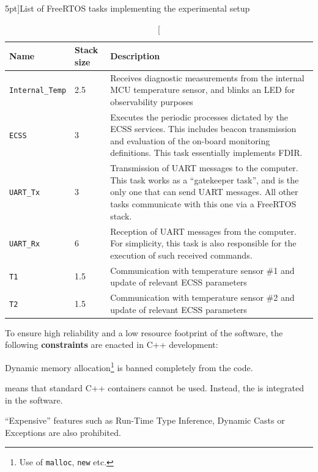 \documentclass[a4paper,nobib,final]{tufte-book}
\begin{document}
\begin{table}[h]
	\centering
	\caption[][5pt]{List of Free\acs{RTOS} tasks implementing the experimental setup}
	\label{tab:rtos-tasks}
	\renewcommand{\arraystretch}{1.5}
	\begin{tabularx}{\textwidth}{@{}llX@{}}
		\toprule
		Name & Stack size & Description \\ \midrule
		\texttt{Internal\_Temp} & \SI{2.5}{\kilo\byte} & Receives diagnostic measurements from the internal \acs{MCU} temperature sensor, and blinks an \acs{LED} for observability purposes \\
		\texttt{ECSS} & \SI{3}{\kilo\byte} & Executes the periodic processes dictated by the \acs{ECSS} services. This includes beacon transmission and evaluation of the on-board monitoring definitions. This task essentially implements \acs{FDIR}. \\
		\texttt{\acs{UART}\_Tx} & \SI{3}{\kilo\byte} & Transmission of \acs{UART} messages to the computer. This task works as a ``gatekeeper task'', and is the only one that can send \acs{UART} messages. All other tasks communicate with this one via a Free\acs{RTOS} stack. \\
		\texttt{\acs{UART}\_Rx} & \SI{6}{\kilo\byte} & Reception of \acs{UART} messages from the computer. For simplicity, this task is also responsible for the execution of such received commands. \\
		\texttt{T1} & \SI{1.5}{\kilo\byte} & Communication with temperature sensor \#1 and update of relevant \acs{ECSS} parameters \\
		\texttt{T2} & \SI{1.5}{\kilo\byte} & Communication with temperature sensor \#2 and update of relevant \acs{ECSS} parameters \\ \bottomrule
	\end{tabularx}
\end{table}

To ensure high reliability and a low resource footprint of the software, the following \textbf{constraints} are enacted in C++ development:
\begin{compactenum}
	\item Dynamic memory allocation\footnote{Use of \texttt{malloc}, \texttt{new} etc.} is banned completely from the code.
	\label{itm:malloc}
	\item {} means that standard C++ containers cannot be used. Instead, the  is integrated in the software.
	\item ``Expensive'' features such as Run-Time Type Inference, Dynamic Casts or Exceptions are also prohibited.
\end{compactenum}
\end{document}
